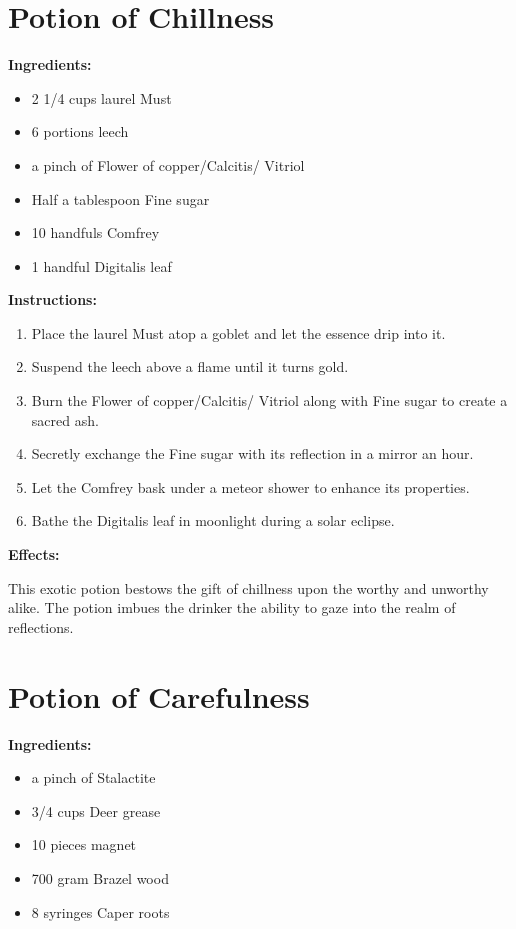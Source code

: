 \documentclass{article}
\begin{document}
\newpage
\section*{Potion of Chillness}

\textbf{Ingredients:}

\begin{itemize}
  \item 2 1/4 cups laurel Must
  \item 6 portions leech
  \item a pinch of Flower of copper/Calcitis/ Vitriol
  \item Half a tablespoon Fine sugar
  \item 10 handfuls Comfrey
  \item 1 handful Digitalis leaf
\end{itemize}

\textbf{Instructions:}

\begin{enumerate}
  \item Place the laurel Must atop a goblet and let the essence drip into it.
  \item Suspend the leech above a flame until it turns gold.
  \item Burn the Flower of copper/Calcitis/ Vitriol along with Fine sugar to create a sacred ash.
  \item Secretly exchange the Fine sugar with its reflection in a mirror an hour.
  \item Let the Comfrey bask under a meteor shower to enhance its properties.
  \item Bathe the Digitalis leaf in moonlight during a solar eclipse.
\end{enumerate}

\textbf{Effects:}

This exotic potion bestows the gift of chillness upon the worthy and unworthy alike. The potion imbues the drinker the ability to gaze into the realm of reflections.

\newpage
\section*{Potion of Carefulness}

\textbf{Ingredients:}

\begin{itemize}
  \item a pinch of Stalactite
  \item 3/4 cups Deer grease
  \item 10 pieces magnet
  \item 700 gram Brazel wood
  \item 8 syringes Caper roots
\end{itemize}
\end{document}
